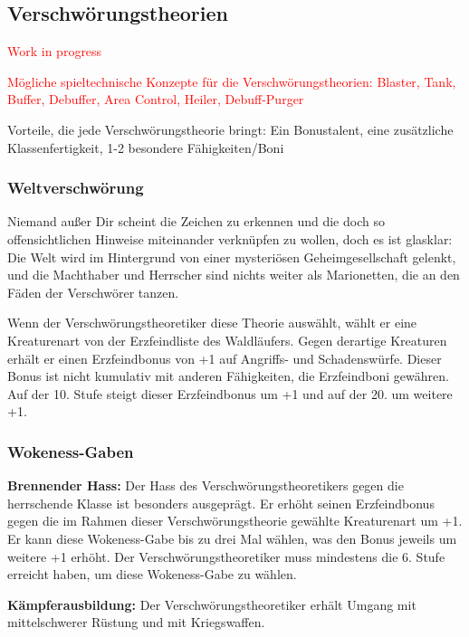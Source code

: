 \documentclass[
	ngerman,
	a4paper,
	11pt,
	twocolumn,
]{scrartcl}
\begin{document}
\subsection*{Verschwörungstheorien}

\textcolor{red}{Work in progress}

\textcolor{red}{Mögliche spieltechnische Konzepte für die Verschwörungstheorien: Blaster, Tank, Buffer, Debuffer, Area Control, Heiler, Debuff-Purger}

Vorteile, die jede Verschwörungstheorie bringt: Ein Bonustalent, eine zusätzliche Klassenfertigkeit, 1-2 besondere Fähigkeiten/Boni

\subsubsection*{Weltverschwörung}

Niemand außer Dir scheint die Zeichen zu erkennen und die doch so offensichtlichen Hinweise miteinander verknüpfen zu wollen, doch es ist glasklar: Die Welt wird im Hintergrund von einer mysteriösen Geheimgesellschaft gelenkt, und die Machthaber und Herrscher sind nichts weiter als Marionetten, die an den Fäden der Verschwörer tanzen.

Wenn der Verschwörungstheoretiker diese Theorie auswählt, wählt er eine Kreaturenart von der Erzfeindliste des Waldläufers. Gegen derartige Kreaturen erhält er einen Erzfeindbonus von +1 auf Angriffs- und Schadenswürfe. Dieser Bonus ist nicht kumulativ mit anderen Fähigkeiten, die Erzfeindboni gewähren. Auf der 10. Stufe steigt dieser Erzfeindbonus um +1 und auf der 20. um weitere +1.

\vspace{-3ex}

\subsubsection*{Wokeness-Gaben}

\textbf{Brennender Hass:} Der Hass des Verschwörungstheoretikers gegen die herrschende Klasse ist besonders ausgeprägt. Er erhöht seinen Erzfeindbonus gegen die im Rahmen dieser Verschwörungstheorie gewählte Kreaturenart um +1. Er kann diese Wokeness-Gabe bis zu drei Mal wählen, was den Bonus jeweils um weitere +1 erhöht. Der Verschwörungstheoretiker muss mindestens die 6. Stufe erreicht haben, um diese Wokeness-Gabe zu wählen.

\textbf{Kämpferausbildung:} Der Verschwörungstheoretiker erhält Umgang mit mittelschwerer Rüstung und mit Kriegswaffen.
\end{document}
